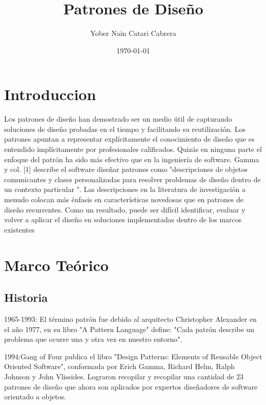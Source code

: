 \documentclass[twoside,twocolumn]{article}
\title{Patrones de Diseño} %
\author{Yober Nain Catari Cabrera }
\date{\today} %
\begin{document}
\maketitle


\section{Introduccion}

\lettrine[nindent=0em,lines=3]{L}os patrones de diseño han demostrado ser un medio útil de
capturando soluciones de diseño probadas en el tiempo y facilitando su reutilización.
Los patrones apuntan a representar explícitamente el conocimiento de diseño que es
entendido implícitamente por profesionales calificados.
Quizás en ninguna parte el enfoque del patrón ha sido más efectivo
que en la ingeniería de software. Gamma y col. [1] describe el software
diseñar patrones como "descripciones de objetos comunicantes y
clases personalizadas para resolver problemas de diseño dentro de un
contexto particular ".
Las descripciones en la literatura de investigación a menudo colocan más
énfasis en características novedosas que en patrones de diseño recurrentes. Como un
resultado, puede ser difícil identificar, evaluar y volver a aplicar el diseño
en soluciones implementadas dentro de los marcos existentes


\section {Marco Teórico}\label{sec:3}
\subsection{Historia}
1965-1993: El término patrón fue debido al arquitecto Christopher Alexander en el año 1977, en su libro "A Pattern Language" define: "Cada patrón describe un problema que ocurre una y otra vez en nuestro entorno".

1994:Gang of Four publica el libro "Design Patterns: Elements of Reusable Object Oriented Software", conformada por Erich Gamma, Richard Helm, Ralph Johnson y John Vlissides. Lograron recopilar y recopilar una cantidad de 23 patrones de diseño que ahora son aplicados por expertos diseñadores de software orientado a objetos.
\end{document}
